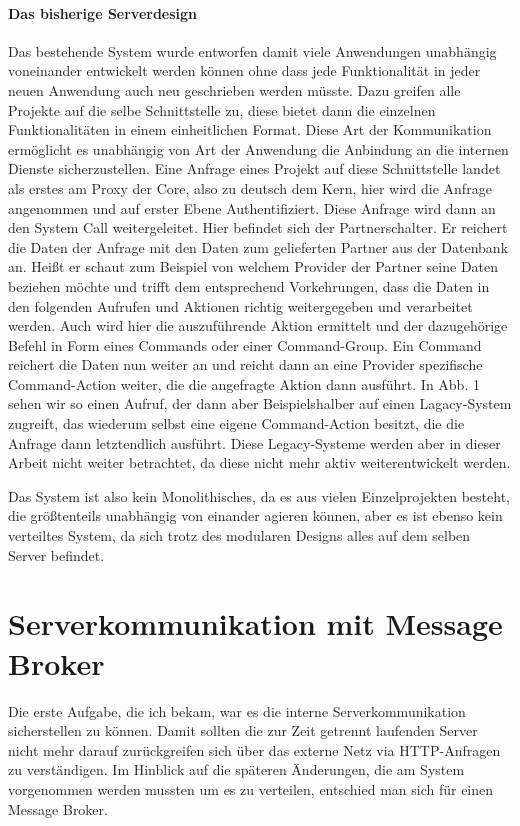 \documentclass[12pt,a4paper]{article}
\begin{document}
\paragraph{Das bisherige Serverdesign}
Das bestehende System wurde entworfen damit viele Anwendungen unabhängig voneinander entwickelt werden können ohne dass jede Funktionalität in jeder neuen Anwendung auch neu geschrieben werden müsste. Dazu greifen alle Projekte auf die selbe Schnittstelle zu, diese bietet dann die einzelnen Funktionalitäten in einem einheitlichen Format. Diese Art der Kommunikation ermöglicht es unabhängig von Art der Anwendung die Anbindung an die internen Dienste sicherzustellen. Eine Anfrage eines Projekt auf diese Schnittstelle landet als erstes am Proxy der Core, also zu deutsch dem Kern, hier wird die Anfrage angenommen und auf erster Ebene Authentifiziert. Diese Anfrage wird dann an den System Call weitergeleitet. Hier befindet sich der Partnerschalter. Er reichert die Daten der Anfrage mit den Daten zum gelieferten Partner aus der Datenbank an. Heißt er schaut zum Beispiel von welchem Provider der Partner seine Daten beziehen möchte und trifft dem entsprechend Vorkehrungen, dass die Daten in den folgenden Aufrufen und Aktionen richtig weitergegeben und verarbeitet werden. Auch wird hier die auszuführende Aktion ermittelt und der dazugehörige Befehl in Form eines Commands oder einer Command-Group. Ein Command reichert die Daten nun weiter an und reicht dann an eine Provider spezifische Command-Action weiter, die die angefragte Aktion dann ausführt. In Abb. 1 sehen wir so einen Aufruf, der dann aber Beispielshalber auf einen Lagacy-System zugreift, das wiederum selbst eine eigene Command-Action besitzt, die die Anfrage dann letztendlich ausführt. Diese Legacy-Systeme werden aber in dieser Arbeit nicht weiter betrachtet, da diese nicht mehr aktiv weiterentwickelt werden. 

Das System ist also kein Monolithisches, da es aus vielen Einzelprojekten besteht, die größtenteils unabhängig von einander agieren können, aber es ist ebenso kein verteiltes System, da sich trotz des modularen Designs alles auf dem selben Server befindet.

\section{Serverkommunikation mit Message Broker} \label{rabbit}
Die erste Aufgabe, die ich bekam, war es die interne Serverkommunikation sicherstellen zu können. Damit sollten die zur Zeit getrennt laufenden Server nicht mehr darauf zurückgreifen sich über das externe Netz via \gls{HTTP}-Anfragen zu verständigen. Im Hinblick auf die späteren Änderungen, die am System vorgenommen werden mussten um es zu verteilen, entschied man sich für einen Message Broker.
\end{document}
